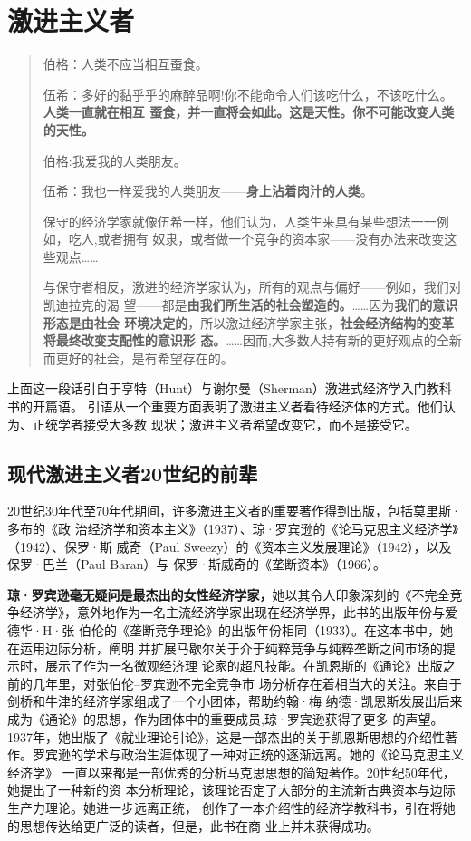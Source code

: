 \section{激进主义者}

\begin{quotation}
伯格：人类不应当相互蚕食。

伍希：多好的黏乎乎的麻醉品啊!你不能命令人们该吃什么，不该吃什么。\textbf{人类一直就在相互
蚕食，并一直将会如此。这是天性。你不可能改变人类的天性。}

伯格:我爱我的人类朋友。

伍希：我也一样爱我的人类朋友——\textbf{身上沾着肉汁的人类}。

\bigskip

保守的经济学家就像伍希一样，他们认为，人类生来具有某些想法一一例如，吃人,或者拥有
奴隶，或者做一个竞争的资本家——没有办法来改变这些观点……

与保守者相反，激进的经济学家认为，所有的观点与偏好——例如，我们对凯迪拉克的渴
望——都是\textbf{由我们所生活的社会塑造的。}……因为\textbf{我们的意识形态是由社会
  环境决定的}，所以激进经济学家主张，\textbf{社会经济结构的变革将最终改变支配性的意识形
态。}……因而,大多数人持有新的更好观点的全新而更好的社会，是有希望存在的。
\end{quotation}

上面这一段话引自于亨特（Hunt）与谢尔曼（Sherman）激进式经济学入门教科书的开篇语。
引语从一个重要方面表明了激进主义者看待经济体的方式。他们认为、正统学者接受大多数
现状；激进主义者希望改变它，而不是接受它。


\subsection{现代激进主义者20世纪的前辈}

20世纪30年代至70年代期间，许多激进主义者的重要著作得到出版，包括莫里斯·多布的《政
治经济学和资本主义》（1937）、琼·罗宾逊的《论马克思主义经济学》（1942）、保罗·斯
威奇（Paul Sweezy）的《资本主义发展理论》（1942），以及保罗·巴兰（Paul Baran）与
保罗·斯威奇的《垄断资本》（1966）。

\textbf{琼·罗宾逊毫无疑问是最杰出的女性经济学家，}她以其令人印象深刻的《不完全竞
争经济学》，意外地作为一名主流经济学家出现在经济学界，此书的出版年份与爱德华·H·张
伯伦的《垄断竞争理论》的出版年份相同（1933）。在这本书中，她在运用边际分析，阐明
并扩展马歇尔关于介于纯粹竞争与纯粹垄断之间市场的提示时，展示了作为一名微观经济理
论家的超凡技能。在凯恩斯的《通论》出版之前的几年里，对张伯伦--罗宾逊不完全竞争市
场分析存在着相当大的关注。来自于剑桥和牛津的经济学家组成了一个小团体，帮助约翰·梅
纳德·凯恩斯发展出后来成为《通论》的思想，作为团体中的重要成员,琼·罗宾逊获得了更多
的声望。1937年，她出版了《就业理论引论》，这是一部杰出的关于凯恩斯思想的介绍性著
作。罗宾逊的学术与政治生涯体现了一种对正统的逐渐远离。她的《论马克思主义经济学》
一直以来都是一部优秀的分析马克思思想的简短著作。20世纪50年代，她提出了一种新的资
本分析理论，该理论否定了大部分的主流新古典资本与边际生产力理论。她进一步远离正统，
创作了一本介绍性的经济学教科书，引在将她的思想传达给更广泛的读者，但是，此书在商
业上并未获得成功。

